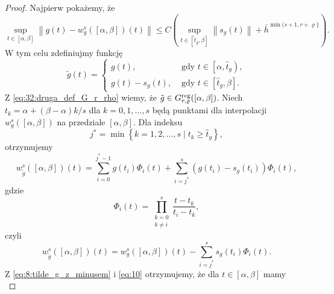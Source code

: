 \documentclass[oik, pdftex, man]{mgrwms}
\begin{document}
    \begin{proof}
        Najpierw pokażemy, że
        \begin{equation} \label{eq:7}
            \sup _{t \in[\alpha, \beta]}\left\|g(t)-w_{g}^{s}([\alpha, \beta])(t)\right\| \leq C\left(\sup _{t \in\left[\hat{t}_{g}, \beta\right]}\left\|s_{g}(t)\right\|+\bar{h}^{\min (s+1, r+\varrho\}}\right).
        \end{equation}
        W tym celu zdefiniujmy funkcję
        \begin{equation} \label{eq:8:tilde_g_z_minusem}
            \tilde{g}(t)= \begin{cases}
                g(t),            & \text { gdy } t \in\left[\alpha, \hat{t}_{g}\right), \\ 
                g(t)-s_{g}(t),   & \text { gdy } t \in\left[\hat{t}_{g}, \beta\right].
            \end{cases}
        \end{equation}
        Z \eqref{eq:32:druga_def_G_r_rho} wiemy, że $\tilde{g} \in G_{r, \varrho}^{\mathrm{reg}}([\alpha, \beta])$. Niech $t_{k}=\alpha+(\beta-\alpha) k / s$ dla $k=0,1, \ldots, s$ będą punktami dla interpolacji $w_{g}^{s}([\alpha, \beta])$ na przedziale $[\alpha, \beta]$. Dla indeksu
        \begin{equation} \label{eq:9}
            j^{*}=\min \left\{k=1,2, \ldots, s \mid t_{k} \geq \hat{t}_{g}\right\},
        \end{equation}
        otrzymujemy
        \begin{equation} \label{eq:10}
            w_{\tilde{g}}^{s}([\alpha, \beta])(t)=\sum_{i=0}^{j^{*}-1} g\left(t_{i}\right) \Phi_{i}(t)+\sum_{i=j^{*}}^{s}\left(g\left(t_{i}\right)-s_{g}\left(t_{i}\right)\right) \Phi_{i}(t),
        \end{equation}
        gdzie
        \begin{equation*}
            \Phi_{i}(t)=\prod_{\substack{k=0 \\ k \neq i}}^{s} \frac{t-t_{k}}{t_{i}-t_{k}},
        \end{equation*}
        czyli
        \begin{equation*} \label{eq:11}
            w_{\tilde{g}}^{s}([\alpha, \beta])(t)=w_{g}^{s}([\alpha, \beta])(t)-\sum_{i=j^{*}}^{s} s_{g}\left(t_{i}\right) \Phi_{i}(t).
        \end{equation*}
        Z \eqref{eq:8:tilde_g_z_minusem} i \eqref{eq:10} otrzymujemy, że dla $t \in [\alpha, \beta]$ mamy
        \begin{equation*} \label{eq:12}

\end{equation*}
\end{proof}
\end{document}
